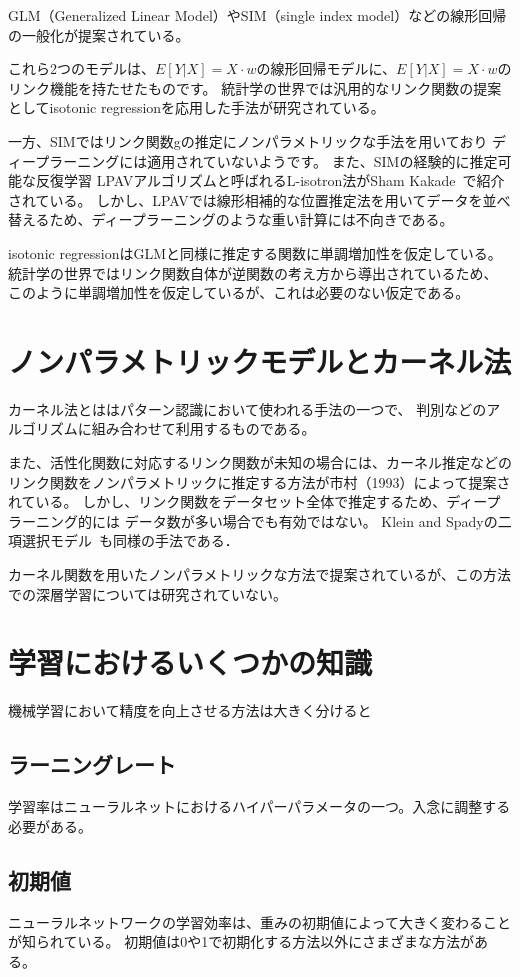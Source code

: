 GLM（Generalized Linear Model）やSIM（single index model）などの線形回帰の一般化が提案されている。

これら2つのモデルは、$ E[Y|X]=X\cdot w $の線形回帰モデルに、$ E[Y|X]=X\cdot w $のリンク機能を持たせたものです。 
統計学の世界では汎用的なリンク関数の提案としてisotonic regressionを応用した手法が研究されている。


 一方、SIMではリンク関数gの推定にノンパラメトリックな手法を用いており ディープラーニングには適用されていないようです。
 また、SIMの経験的に推定可能な反復学習 LPAVアルゴリズムと呼ばれるL-isotron法がSham Kakade~\cite{efficient_sim}で紹介されている。 
 しかし、LPAVでは線形相補的な位置推定法を用いてデータを並べ替えるため、ディープラーニングのような重い計算には不向きである。 

isotonic regressionはGLMと同様に推定する関数に単調増加性を仮定している。統計学の世界ではリンク関数自体が逆関数の考え方から導出されているため、
このように単調増加性を仮定しているが、これは必要のない仮定である。

\section{ノンパラメトリックモデルとカーネル法}

カーネル法とははパターン認識において使われる手法の一つで、 判別などのアルゴリズムに組み合わせて利用するものである。

 また、活性化関数に対応するリンク関数が未知の場合には、カーネル推定などのリンク関数をノンパラメトリックに推定する方法が市村（1993）によって提案されている。
 しかし、リンク関数をデータセット全体で推定するため、ディープラーニング的には データ数が多い場合でも有効ではない。
 Klein and Spadyの二項選択モデル~\cite{klein}も同様の手法である．

 カーネル関数を用いたノンパラメトリックな方法で提案されているが、この方法での深層学習については研究されていない。




\section{学習におけるいくつかの知識}
機械学習において精度を向上させる方法は大きく分けると
\subsection{ラーニングレート}
学習率はニューラルネットにおけるハイパーパラメータの一つ。入念に調整する必要がある。
\subsection{初期値}
ニューラルネットワークの学習効率は、重みの初期値によって大きく変わることが知られている。
初期値は0や1で初期化する方法以外にさまざまな方法がある。


